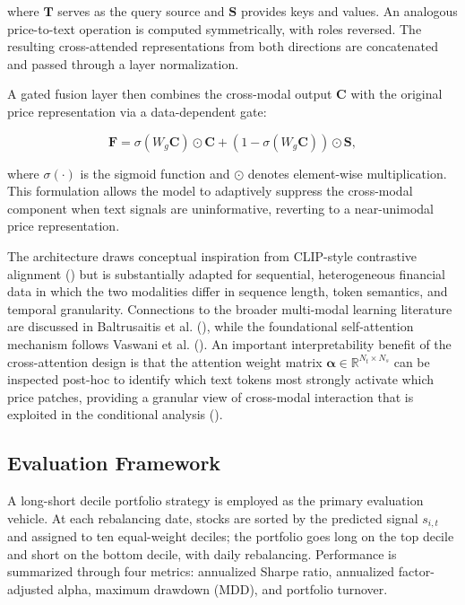 \documentclass[
  11pt,
  a4paper,
]{article}
\begin{document}
where \(\mathbf{T}\) serves as the query source and \(\mathbf{S}\)
provides keys and values. An analogous price-to-text operation is
computed symmetrically, with roles reversed. The resulting
cross-attended representations from both directions are concatenated and
passed through a layer normalization.

A gated fusion layer then combines the cross-modal output \(\mathbf{C}\)
with the original price representation via a data-dependent gate:

\[\mathbf{F} = \sigma(W_g \mathbf{C}) \odot \mathbf{C} + \left(1 - \sigma(W_g \mathbf{C})\right) \odot \mathbf{S},\]

where \(\sigma(\cdot)\) is the sigmoid function and \(\odot\) denotes
element-wise multiplication. This formulation allows the model to
adaptively suppress the cross-modal component when text signals are
uninformative, reverting to a near-unimodal price representation.

The architecture draws conceptual inspiration from CLIP-style
contrastive alignment ()
but is substantially adapted for sequential, heterogeneous financial
data in which the two modalities differ in sequence length, token
semantics, and temporal granularity. Connections to the broader
multi-modal learning literature are discussed in Baltrusaitis et al.
(), while the foundational
self-attention mechanism follows Vaswani et al.
(). An important interpretability
benefit of the cross-attention design is that the attention weight
matrix \(\boldsymbol{\alpha} \in \mathbb{R}^{N_t \times N_s}\) can be
inspected post-hoc to identify which text tokens most strongly activate
which price patches, providing a granular view of cross-modal
interaction that is exploited in the conditional analysis
().

\subsection{Evaluation Framework}\label{evaluation-framework}

A long-short decile portfolio strategy is employed as the primary
evaluation vehicle. At each rebalancing date, stocks are sorted by the
predicted signal \(s_{i,t}\) and assigned to ten equal-weight deciles;
the portfolio goes long on the top decile and short on the bottom
decile, with daily rebalancing. Performance is summarized through four
metrics: annualized Sharpe ratio, annualized factor-adjusted alpha,
maximum drawdown (MDD), and portfolio turnover.
\end{document}

